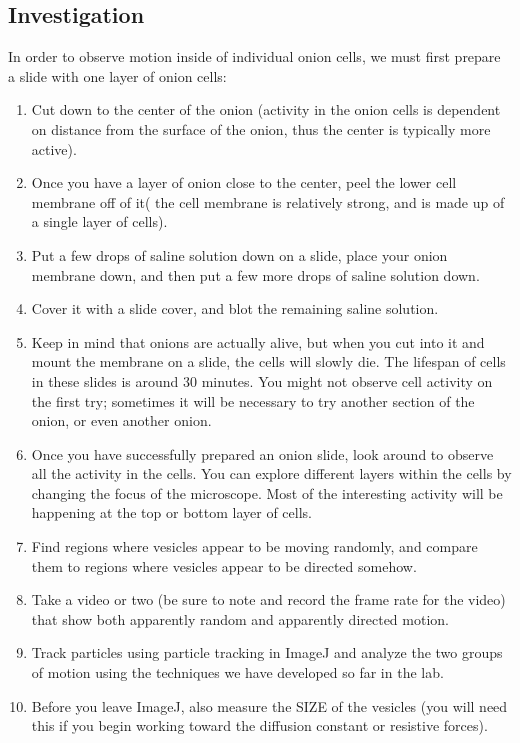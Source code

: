 \subsection*{Investigation}
In order to observe motion inside of individual onion cells, we must first prepare a slide with one layer of onion cells:
\begin{enumerate}
\item Cut down to the center of the onion (activity in the onion cells is dependent on distance from the surface of the onion, thus the center is typically more active). 
\item Once you have a layer of onion close to the center, peel the lower cell membrane off of it( the cell membrane is relatively strong, and is made up of a single layer of cells). 
\item Put a few drops of saline solution down on a slide, place your onion membrane down, and then put a few more drops of saline solution down. 
\item Cover it with a slide cover, and blot the remaining saline solution. 
\item Keep in mind that onions are actually alive, but when you cut into it and mount the membrane on a slide, the cells will slowly die. The lifespan of cells in these slides is around 30 minutes. You might not observe cell activity on the first try; sometimes it will be necessary to try another section of the onion, or even another onion. 
\item Once you have successfully prepared an onion slide, look around to observe all the activity in the cells. You can explore different layers within the cells by changing the focus of the microscope. Most of the interesting activity will be happening at the top or bottom layer of cells. 
\item Find regions where vesicles appear to be moving randomly, and compare them to regions where vesicles appear to be directed somehow. 
\item Take a video or two (be sure to note and record the frame rate for the video) that show both apparently random and apparently directed motion. 
\item Track particles using particle tracking in ImageJ and analyze the two groups of motion using the techniques we have developed so far in the lab. 
\item Before you leave ImageJ, also measure the SIZE of the vesicles (you will need this if you begin working toward the diffusion constant or resistive forces).
\end{enumerate}

